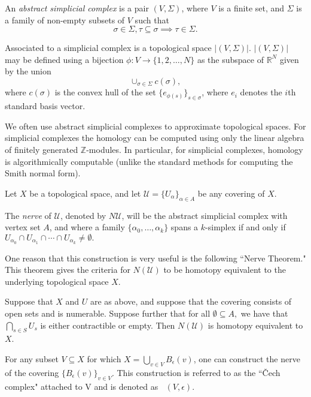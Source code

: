 \documentclass[11pt,reqno,oneside,a4paper]{article}
\DeclareMathOperator{\Cech}{\check{C}}
\begin{document}
\begin{defn}
	An \textit{abstract simplicial complex} is a pair $(V, \Sigma)$, where $V$ is a finite set, and $\Sigma$ is a family of non-empty subsets of $V$ such that 
	$$\sigma \in \Sigma, \tau \subseteq \sigma \implies \tau \in \Sigma.$$
	
	Associated to a simplicial complex is a topological space $|(V,\Sigma)|$. $|(V,\Sigma)|$ may be defined using a bijection $\phi : V \to \{1, 2, \dots,N\}$ as the subspace of $\mathbb{R}^N$ given by the union 
	$$\cup_{\sigma \in \Sigma} c(\sigma),$$
	where $c(\sigma)$ is the convex hull of the set $\{e_{\phi(s)}\}_{s\in \sigma}$, where $e_i$ denotes the $i$th standard basis vector.
\end{defn}

	 We often use abstract simplicial complexes to approximate topological spaces. For simplicial complexes the homology can be computed using only the linear algebra of finitely generated $\mathbb{Z}$-modules. In particular, for simplicial complexes, homology is algorithmically computable (unlike the standard methods for computing the Smith normal form).

\begin{defn}
	Let $X$ be a topological space, and let $\mathcal{U} = \{U_\alpha\}_{\alpha\in A}$ be any covering of $X$. 
	
	The \textit{nerve} of $\mathcal{U}$, denoted by $N\mathcal{U}$, will be the abstract simplicial complex with vertex set $A$, and where a family $\{\alpha_0, \dots, \alpha_k\}$ spans a $k$-simplex if and only if $U_{\alpha_0}\cap U_{\alpha_1} \cap \cdots \cap U_{\alpha_k} \neq \emptyset.$
\end{defn}

One reason that this construction is very useful is the following ``Nerve Theorem." This theorem gives the criteria for $N(\mathcal{U})$ to be homotopy equivalent to the underlying topological space $X$.

\begin{thm}
Suppose that $X$ and $U$ are as above, and suppose that the covering consists of open sets and is numerable. Suppose further that for all $\emptyset \subseteq A,$ we have that $\bigcap_{s\in S} U_s$ is either contractible or empty. Then $N(\mathcal{U})$ is homotopy equivalent to $X$.
\end{thm}

\begin{defn}
	For any subset $V\subseteq X$ for which $X = \bigcup_{v\in V}B_\epsilon(v)$, one can construct the nerve of the covering $\{B_\epsilon(v)\}_{v\in V}$. This construction is referred to as the ``\v{C}ech complex" attached to V and is denoted as $\Cech(V,\epsilon)$.
\end{defn}
\end{document}
